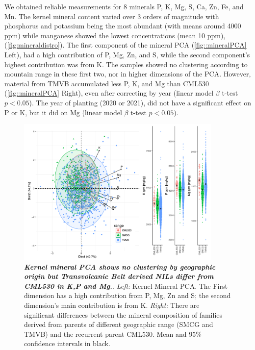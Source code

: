 We obtained reliable measurements for 8 minerals P, K, Mg, S, Ca, Zn, Fe, and Mn. 
The kernel mineral content varied over 3 orders of magnitude with phosphorus and potassium being the most abundant (with means around 4000 ppm) while manganese showed the lowest concentrations (mean 10 ppm), (\autoref{fig:mineraldistro}). 
The first component of the mineral PCA (\autoref{fig::mineralPCA} Left), had a high contribution of P, Mg, Zn, and S, while the second component's highest contribution was from K. 
The samples showed no clustering according to mountain range in these first two, nor in higher dimensions of the PCA. 
However, material from TMVB accumulated less  P, K, and Mg than CML530 (\autoref{fig::mineralPCA} Right), even after correcting by year (linear model $\beta$ t-test  $p < 0.05$). The year of planting (2020 or 2021), did not have a significant effect on  P or K, but it did on Mg (linear model $\beta$ t-test  $p < 0.05$).

\begin{figure}[!ht]
\centering
\includegraphics[width=0.9\textwidth]{Chapter-4/figs/mineral_PCA.png}
\caption[ Kernel mineral PCA shows no clustering by geographic origin but Transvolcanic Belt derived NILs differ from CML530 in K,P and Mg. ]{\textit{\textbf{Kernel mineral PCA shows no clustering by geographic origin but Transvolcanic Belt derived NILs differ from CML530 in K,P and Mg.}}. \textit{Left:} Kernel Mineral PCA. The First dimension has a high contribution from P, Mg, Zn and S; the second dimension's main contribution is from K.  
\textit{Right:} There are significant differences between the mineral composition of families derived from parents of different geographic range (SMCG and TMVB) and the recurrent parent CML530.
Mean and $95\%$ confidence intervals in black.}
\label{fig::mineralPCA}
\end{figure}
\clearpage


